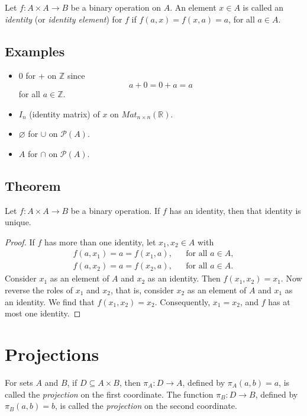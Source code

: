 \documentclass[11pt]{article}
\let\emptyset\varnothing
\begin{document}
    Let \(f: A \times A \rightarrow B\) be a binary operation on $A$. An element \(x \in A\) is called an \emph{identity} (or \emph{identity element}) for $f$ if \(f(a,x) = f(x,a) = a\), for all \(a \in A\).

    \subsection{Examples}

    \begin{itemize}
        \item 0 for + on \(\mathbb{Z}\) since \[a + 0 = 0 + a = a\] for all \(a \in \mathbb{Z}\).
        \item \(I_n\) (identity matrix) of $x$ on \(Mat_{n \times n} (\mathbb{R})\).
        \item \(\emptyset\) for \(\cup\) on \(\mathcal{P}(A)\).
        \item $A$ for \(\cap\) on \(\mathcal{P}(A)\).
    \end{itemize}

    \subsection{Theorem}

    Let \(f : A \times A \rightarrow B\) be a binary operation. If $f$ has an identity, then that identity is unique.
    \begin{proof}
        If $f$ has more than one identity, let \(x_1, x_2 \in A\) with
        \begin{align*}
            f(a, x_1) = a = f(x_1,a), && \text{for all } a \in A, \\
            f(a, x_2) = a = f(x_2,a), && \text{for all } a \in A.
        \end{align*}
        Consider \(x_1\) as an element of $A$ and $x_2$ as an identity. Then \(f(x_1,x_2) = x_1\). Now reverse the roles of \(x_1\) and \(x_2\), that is, consider \(x_2\) as an element of $A$ and $x_1$ as an identity. We find that \(f(x_1,x_2) = x_2\). Consequently, \(x_1 = x_2\), and $f$ has at most one identity.
    \end{proof}

    \section{Projections}

    For sets $A$ and $B$, if \(D \subseteq A \times B\), then \(\pi_A : D \rightarrow A\), defined by \(\pi_A (a,b) = a\), is called the \emph{projection} on the first coordinate. The function \(\pi_B : D \rightarrow B\), defined by \(\pi_B (a,b) = b\), is called the \emph{projection} on the second coordinate.
\end{document}
